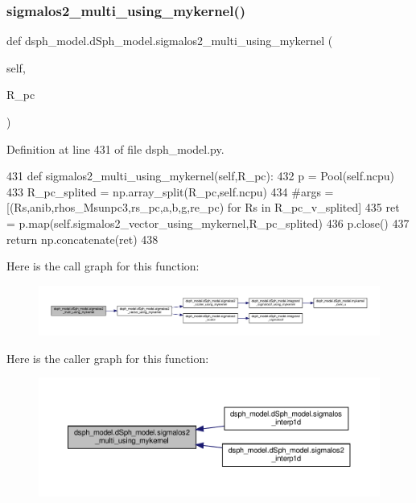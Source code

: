 \subsubsection{\texorpdfstring{sigmalos2\+\_\+multi\+\_\+using\+\_\+mykernel()}{sigmalos2\_multi\_using\_mykernel()}}
{\footnotesize\ttfamily def dsph\+\_\+model.\+d\+Sph\+\_\+model.\+sigmalos2\+\_\+multi\+\_\+using\+\_\+mykernel (\begin{DoxyParamCaption}\item[{}]{self,  }\item[{}]{R\+\_\+pc }\end{DoxyParamCaption})}



Definition at line 431 of file dsph\+\_\+model.\+py.


\begin{DoxyCode}
431     \textcolor{keyword}{def }sigmalos2\_multi\_using\_mykernel(self,R\_pc):
432         p = Pool(self.ncpu)
433         R\_pc\_splited = np.array\_split(R\_pc,self.ncpu)
434         \textcolor{comment}{#args = [(Rs,anib,rhos\_Msunpc3,rs\_pc,a,b,g,re\_pc) for Rs in R\_pc\_v\_splited]}
435         ret = p.map(self.sigmalos2\_vector\_using\_mykernel,R\_pc\_splited)
436         p.close()
437         \textcolor{keywordflow}{return} np.concatenate(ret)
438 
\end{DoxyCode}
Here is the call graph for this function\+:\nopagebreak
\begin{figure}[H]
\begin{center}
\leavevmode
\includegraphics[width=350pt]{d0/d25/classdsph__model_1_1dSph__model_a0f0607e3d81520eb0c4c8b79dd871f0e_cgraph}
\end{center}
\end{figure}
Here is the caller graph for this function\+:\nopagebreak
\begin{figure}[H]
\begin{center}
\leavevmode
\includegraphics[width=350pt]{d0/d25/classdsph__model_1_1dSph__model_a0f0607e3d81520eb0c4c8b79dd871f0e_icgraph}
\end{center}
\end{figure}
\mbox{\label{classdsph__model_1_1dSph__model_a05b988f7553121226a4d08369c44b4fa}} 
